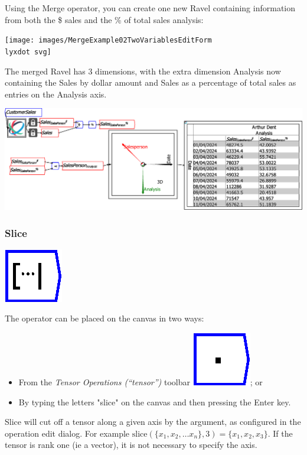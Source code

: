 Using the Merge operator, you can create one new Ravel containing
information from both the \$ sales and the \% of total sales analysis:

\texttt{[image: images/MergeExample02TwoVariablesEditForm\\lyxdot svg]}

The merged Ravel has 3 dimensions, with the extra dimension Analysis
now containing the Sales by dollar amount and Sales as a percentage
of total sales as entries on the Analysis axis.

\includegraphics[width=15cm]{images/MergeExample03TwoVariablesMerged}

\subsubsection{Slice}

\label{Operation:slice}

\includegraphics{images/slice}

The operator can be placed on the canvas in two ways:
\begin{itemize}
\item From the \emph{Tensor Operations (``tensor'')} toolbar \includegraphics{images/innerProduct};
or 
\item By typing the letters "slice" on the canvas and then pressing the
Enter key.
\end{itemize}
Slice will cut off a tensor along a given axis by the argument, as
configured in the operation edit dialog. For example $\mathrm{slice}(\{x_{1},x_{2},\ldots x_{n}\},3)=\{x_{1},x_{2},x_{3}\}$.
If the tensor is rank one (ie a vector), it is not necessary to specify
the axis.

